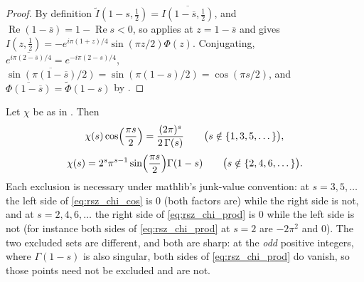 \begin{proof}
\leanok
{}
By definition $\widetilde I(1-s,\tfrac12)=\overline{I(1-\overline{s},\tfrac12)}$, and
$\operatorname{Re}(1-\overline s)=1-\operatorname{Re}s<0$, so  applies at
$z=1-\overline s$ and gives
$I(z,\tfrac12)=-e^{i\pi(1+z)/4}\sin(\pi z/2)\Phi(z)$.  Conjugating,
$\overline{e^{i\pi(2-\overline s)/4}}=e^{-i\pi(2-s)/4}$,
$\overline{\sin(\pi(1-\overline s)/2)}=\sin(\pi(1-s)/2)=\cos(\pi s/2)$, and
$\overline{\Phi(1-\overline s)}=\widetilde\Phi(1-s)$ by .
\end{proof}

\begin{lemma}
\label{lem:rsz_chi}
\leanok
{}
Let $\chi$ be as in .  Then
\begin{equation}
  \chi(s)\cos\Bigl(\frac{\pi s}2\Bigr)=\frac{(2\pi)^{s}}{2\,\Gamma(s)}
    \qquad\bigl(s\notin\{1,3,5,\dots\}\bigr),
  \label{eq:rsz_chi_cos}
\end{equation}
\begin{equation}
  \chi(s)=2^{s}\pi^{s-1}\sin\Bigl(\frac{\pi s}2\Bigr)\Gamma(1-s)
    \qquad\bigl(s\notin\{2,4,6,\dots\}\bigr).
  \label{eq:rsz_chi_prod}
\end{equation}
Each exclusion is necessary under mathlib's junk-value convention: at $s=3,5,\dots$ the
left side of \eqref{eq:rsz_chi_cos} is $0$ (both factors
are) while the right side is not, and at $s=2,4,6,\dots$ the right side of
\eqref{eq:rsz_chi_prod} is $0$ while the left side is not (for instance both sides of
\eqref{eq:rsz_chi_prod} at $s=2$ are $-2\pi^{2}$ and $0$).  The two excluded sets are
different, and both are sharp: at the \emph{odd} positive integers, where $\Gamma(1-s)$ is
also singular, both sides of \eqref{eq:rsz_chi_prod} do vanish, so those points need not be
excluded and are not.
\end{lemma}

